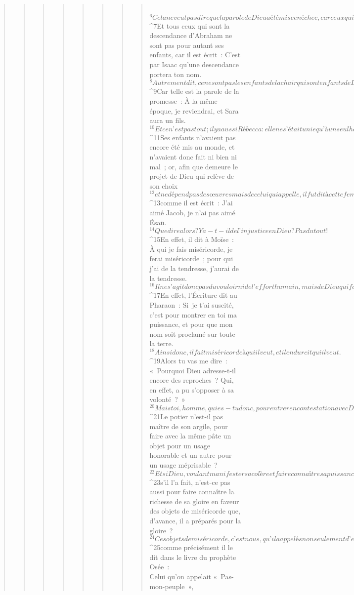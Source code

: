 \begin{verse}
\begin{verse}
\begin{verse}
\begin{verse}
\begin{verse}
\begin{verse}
\begin{verse}
\begin{verse}
         
${}^{6}Cela ne veut pas dire que la parole de Dieu a été mise en échec, car ceux qui sont nés d’Israël ne sont pas tous Israël. 
${}^{7}Et tous ceux qui sont la descendance d’Abraham ne sont pas pour autant ses enfants, car il est écrit : C’est par Isaac qu’une descendance portera ton nom. 
${}^{8}Autrement dit, ce ne sont pas les enfants de la chair qui sont enfants de Dieu, mais ce sont les enfants de la promesse qui sont comptés comme descendance. 
${}^{9}Car telle est la parole de la promesse : À la même époque, je reviendrai, et Sara aura un fils.
${}^{10}Et ce n’est pas tout ; il y a aussi Rébecca : elle ne s’était unie qu’à un seul homme, Isaac notre père. 
${}^{11}Ses enfants n’avaient pas encore été mis au monde, et n’avaient donc fait ni bien ni mal ; or, afin que demeure le projet de Dieu qui relève de son choix 
${}^{12}et ne dépend pas des œuvres mais de celui qui appelle, il fut dit à cette femme : L’aîné servira le plus jeune, 
${}^{13}comme il est écrit : J’ai aimé Jacob, je n’ai pas aimé Ésaü.
${}^{14}Que dire alors ? Y a-t-il de l’injustice en Dieu ? Pas du tout ! 
${}^{15}En effet, il dit à Moïse : À qui je fais miséricorde, je ferai miséricorde ; pour qui j’ai de la tendresse, j’aurai de la tendresse.
${}^{16}Il ne s’agit donc pas du vouloir ni de l’effort humain, mais de Dieu qui fait miséricorde. 
${}^{17}En effet, l’Écriture dit au Pharaon : Si je t’ai suscité, c’est pour montrer en toi ma puissance, et pour que mon nom soit proclamé sur toute la terre. 
${}^{18}Ainsi donc, il fait miséricorde à qui il veut, et il endurcit qui il veut.
${}^{19}Alors tu vas me dire : « Pourquoi Dieu adresse-t-il encore des reproches ? Qui, en effet, a pu s’opposer à sa volonté ? » 
${}^{20}Mais toi, homme, qui es-tu donc, pour entrer en contestation avec Dieu ? L’œuvre dira-t-elle à l’ouvrier : « Pourquoi m’as-tu faite ainsi ? » 
${}^{21}Le potier n’est-il pas maître de son argile, pour faire avec la même pâte un objet pour un usage honorable et un autre pour un usage méprisable ? 
${}^{22}Et si Dieu, voulant manifester sa colère et faire connaître sa puissance, a supporté avec beaucoup de patience des objets de colère voués à la perte, 
${}^{23}s’il l’a fait, n’est-ce pas aussi pour faire connaître la richesse de sa gloire en faveur des objets de miséricorde que, d’avance, il a préparés pour la gloire ? 
${}^{24}Ces objets de miséricorde, c’est nous, qu’il a appelés non seulement d’entre les Juifs, mais aussi d’entre les nations, 
${}^{25}comme précisément il le dit dans le livre du prophète Osée :
       
        \\Celui qu’on appelait « Pas-mon-peuple »,

\end{verse}
\end{verse}
\end{verse}
\end{verse}
\end{verse}
\end{verse}
\end{verse}
\end{verse}
